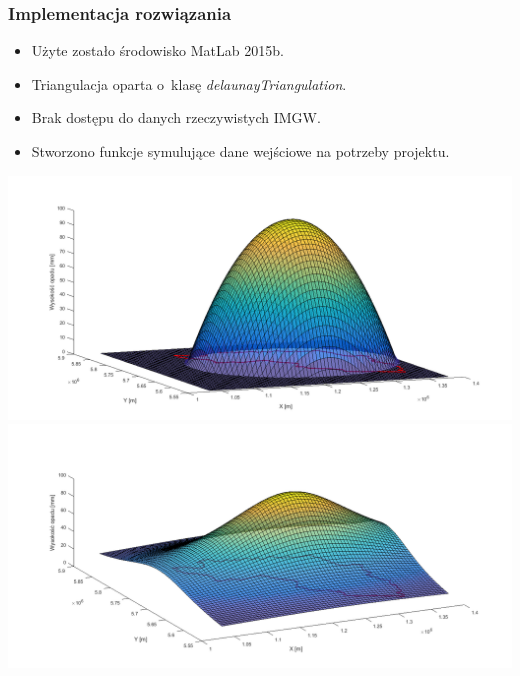 \documentclass{beamer}
\begin{document}
\begin{frame}
\frametitle{Implementacja rozwiązania}
\begin{itemize}
\item{Użyte zostało środowisko MatLab 2015b.}
\item{Triangulacja oparta o~klasę \textit{delaunayTriangulation}.}
\item{Brak dostępu do danych rzeczywistych IMGW.}
\item{Stworzono funkcje symulujące dane wejściowe na potrzeby projektu.}
\end{itemize}
\begin{minipage}[t]{\linewidth}
\includegraphics[width=.5\textwidth]{./../img/chmura_paraboloidalna_1.png}
\includegraphics[width=.5\textwidth]{./../img/chmura_wymierna_1.png}
\end{minipage}

\end{frame}

\end{document}
